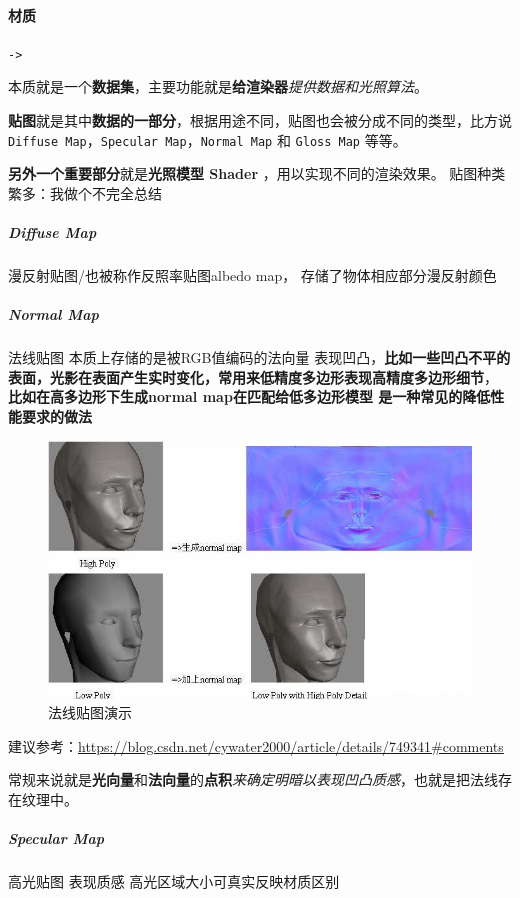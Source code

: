 \documentclass[UTF8,a4paper,12pt]{ctexbook}
\begin{document}
			\paragraph{材质}\verb|->|
			
				本质就是一个\textbf{数据集}，主要功能就是\textbf{给渲染器}\textit{提供数据和光照算法}。
				
				\textbf{贴图}就是其中\textbf{数据的一部分}，根据用途不同，贴图也会被分成不同的类型，比方说 \verb|Diffuse Map|，\verb|Specular Map|，\verb|Normal Map| 和 \verb|Gloss Map| 等等。
				
				\textbf{另外一个重要部分}就是\textbf{光照模型 Shader} ，用以实现不同的渲染效果。 贴图种类繁多：我做个不完全总结
				
				\subparagraph{Diffuse Map}
					漫反射贴图/也被称作反照率贴图albedo map， 存储了物体相应部分漫反射颜色
					
				\subparagraph{Normal Map}
					法线贴图 本质上存储的是被RGB值编码的法向量 表现凹凸，\textbf{比如一些凹凸不平的表面，光影在表面产生实时变化，常用来低精度多边形表现高精度多边形细节}， \textbf{比如在高多边形下生成normal map在匹配给低多边形模型 是一种常见的降低性能要求的做法}
					
					\begin{figure}[H]
						\centering
						\includegraphics[scale=0.8]{normalMap}
						\caption{法线贴图演示}
					\end{figure}
					
					建议参考：\url{https://blog.csdn.net/cywater2000/article/details/749341#comments}
					
					常规来说就是\textbf{光向量}和\textbf{法向量}的\textbf{点积}\textit{来确定明暗以表现凹凸质感}，也就是把法线存在纹理中。
				\subparagraph{Specular Map}
					高光贴图 表现质感 高光区域大小可真实反映材质区别
					
\end{document}
